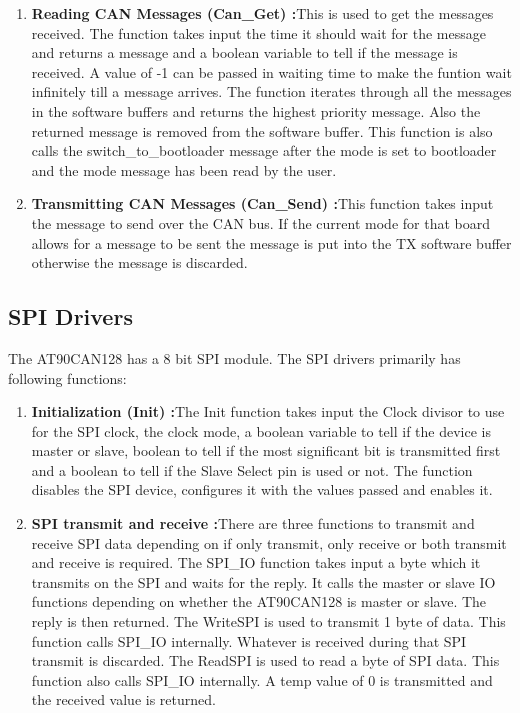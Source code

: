 \begin{enumerate}
\item \textbf{Reading CAN Messages (Can\_Get) :}This is used to get the messages received. The function takes input the time it should wait for the message and returns a message and a boolean variable to tell if the message is received. A value of -1 can be passed in waiting time to make the funtion wait infinitely till a message arrives. The function iterates through all the messages in the software buffers and returns the highest priority message. Also the returned message is removed from the software buffer. This function is also calls the switch\_to\_bootloader message after the mode is set to bootloader and the mode message has been read by the user.
\item \textbf{Transmitting CAN Messages (Can\_Send) :}This function takes input the message to send over the CAN bus. If the current mode for that board allows for a message to be sent the message is put into the TX software buffer otherwise the message is discarded.
\end{enumerate}

\subsection{SPI Drivers}
The AT90CAN128 has a 8 bit SPI module. The SPI drivers primarily has following functions:
\begin{enumerate}
\item \textbf{Initialization (Init) :}The Init function takes input the Clock divisor to use for the SPI clock, the clock mode, a boolean variable to tell if the device is master or slave, boolean to tell if the most significant bit is transmitted first and a boolean to tell if the Slave Select pin is used or not. The function disables the SPI device, configures it with the values passed and enables it.
\item \textbf{SPI transmit and receive :}There are three functions to transmit and receive SPI data depending on if only transmit, only receive or both transmit and receive is required. 
The SPI\_IO function takes input a byte which it transmits on the SPI and waits for the reply. It calls the master or slave IO functions depending on whether the AT90CAN128 is master or slave. The reply is then returned. \newline
The WriteSPI is used to transmit 1 byte of data. This function calls SPI\_IO internally. Whatever is received during that SPI transmit is discarded. \newline
The ReadSPI is used to read a byte of SPI data. This function also calls SPI\_IO internally. A temp value of 0 is transmitted and the received value is returned.
\end{enumerate}

